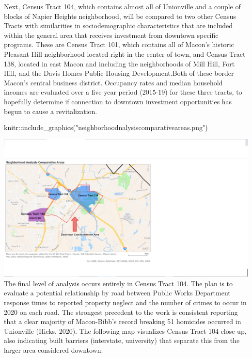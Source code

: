 \documentclass[
]{article}
\newenvironment{Shaded}{\begin{snugshade}}{\end{snugshade}}
\newcommand{\FunctionTok}[1]{\textcolor[rgb]{0.00,0.00,0.00}{#1}}
\newcommand{\NormalTok}[1]{#1}
\newcommand{\SpecialCharTok}[1]{\textcolor[rgb]{0.00,0.00,0.00}{#1}}
\newcommand{\StringTok}[1]{\textcolor[rgb]{0.31,0.60,0.02}{#1}}
\begin{document}
Next, Census Tract 104, which contains almost all of Unionville and a
couple of blocks of Napier Heights neighborhood, will be compared to two
other Census Tracts with similarities in sociodemographic
characteristics that are included within the general area that receives
investment from downtown specific programs. These are Census Tract 101,
which contains all of Macon's historic Pleasant Hill neighborhood
located right in the center of town, and Census Tract 138, located in
east Macon and including the neighborhoods of Mill Hill, Fort Hill, and
the Davis Homes Public Housing Development.Both of these border Macon's
central business district. Occupancy rates and median household incomes
are evaluated over a five year period (2015-19) for these three tracts,
to hopefully determine if connection to downtown investment
opportunities has begun to cause a revitalization.

\begin{Shaded}
\begin{Highlighting}[]
\NormalTok{knitr}\SpecialCharTok{::}\FunctionTok{include\_graphics}\NormalTok{(}\StringTok{"neighborhoodnalysiscomparativeareas.png"}\NormalTok{)}
\end{Highlighting}
\end{Shaded}

\includegraphics{neighborhoodnalysiscomparativeareas.png} The final
level of analysis occurs entirely in Census Tract 104. The plan is to
evaluate a potential relationship by road between Public Works
Department response times to reported property neglect and the number of
crimes to occur in 2020 on each road. The strongest precedent to the
work is consistent reporting that a clear majority of Macon-Bibb's
record breaking 51 homicides occurred in Unionville (Hicks, 2020). The
following map visualizes Census Tract 104 close up, also indicating
built barriers (interstate, university) that separate this from the
larger area considered downtown:
\end{document}
